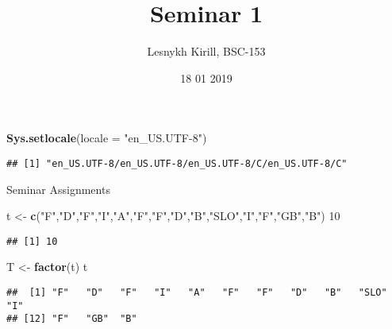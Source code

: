 \documentclass[12pt,]{article}
\title{Seminar 1}
\author{Lesnykh Kirill, BSC-153}
\date{18 01 2019}
\newenvironment{Shaded}{\begin{snugshade}}{\end{snugshade}}
\newcommand{\KeywordTok}[1]{\textcolor[rgb]{0.13,0.29,0.53}{\textbf{#1}}}
\newcommand{\DataTypeTok}[1]{\textcolor[rgb]{0.13,0.29,0.53}{#1}}
\newcommand{\DecValTok}[1]{\textcolor[rgb]{0.00,0.00,0.81}{#1}}
\newcommand{\StringTok}[1]{\textcolor[rgb]{0.31,0.60,0.02}{#1}}
\newcommand{\OtherTok}[1]{\textcolor[rgb]{0.56,0.35,0.01}{#1}}
\newcommand{\OperatorTok}[1]{\textcolor[rgb]{0.81,0.36,0.00}{\textbf{#1}}}
\newcommand{\NormalTok}[1]{#1}
\begin{document}
\maketitle

\begin{Shaded}
\end{Shaded}

\begin{Shaded}
\begin{Highlighting}[]
\KeywordTok{Sys.setlocale}\NormalTok{(}\DataTypeTok{locale =} \StringTok{"en_US.UTF-8"}\NormalTok{)}
\end{Highlighting}
\end{Shaded}

\begin{verbatim}
## [1] "en_US.UTF-8/en_US.UTF-8/en_US.UTF-8/C/en_US.UTF-8/C"
\end{verbatim}

Seminar Assignments

\begin{Shaded}
\begin{Highlighting}[]
\NormalTok{t <-}\StringTok{ }\KeywordTok{c}\NormalTok{(}\StringTok{"F"}\NormalTok{,}\StringTok{"D"}\NormalTok{,}\StringTok{"F"}\NormalTok{,}\StringTok{"I"}\NormalTok{,}\StringTok{"A"}\NormalTok{,}\StringTok{"F"}\NormalTok{,}\StringTok{"F"}\NormalTok{,}\StringTok{"D"}\NormalTok{,}\StringTok{"B"}\NormalTok{,}\StringTok{"SLO"}\NormalTok{,}\StringTok{"I"}\NormalTok{,}\StringTok{"F"}\NormalTok{,}\StringTok{"GB"}\NormalTok{,}\StringTok{"B"}\NormalTok{)}
\DecValTok{10}
\end{Highlighting}
\end{Shaded}

\begin{verbatim}
## [1] 10
\end{verbatim}

\begin{Shaded}
\begin{Highlighting}[]
\NormalTok{T <-}\StringTok{ }\KeywordTok{factor}\NormalTok{(t)}
\NormalTok{t}
\end{Highlighting}
\end{Shaded}

\begin{verbatim}
##  [1] "F"   "D"   "F"   "I"   "A"   "F"   "F"   "D"   "B"   "SLO" "I"  
## [12] "F"   "GB"  "B"
\end{verbatim}
\end{document}

